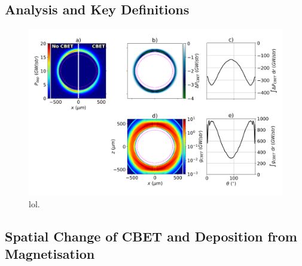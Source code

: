 \subsection{Analysis and Key Definitions}%
\label{sec:Res2_analysis_definitions}

\begin{figure}[t!]
    \includegraphics[width=\linewidth]{Results2/Images/magcbet_analysis.png}
    \centering
    \caption{lol.}%
    \label{fig:Res2_magcbet_analysis}
\end{figure}


\subsection{Spatial Change of CBET and Deposition from Magnetisation}%
\label{sec:Res2_mag_on_cbet_change}

